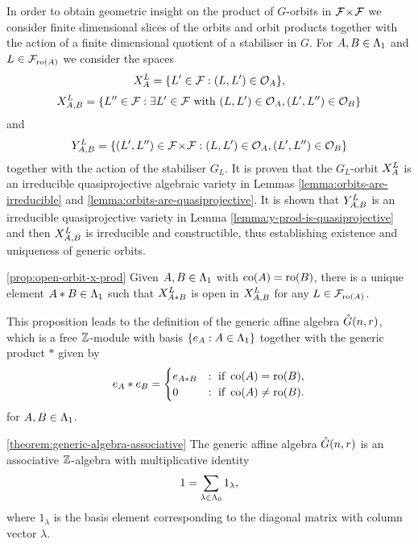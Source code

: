 \documentclass[a4paper, 11pt, twoside]{report}
\begin{document}
In order to obtain geometric insight on the product of $G$-orbits in $\dblflags$ we consider finite dimensional slices of the orbits and orbit products together with the action of a finite dimensional quotient of a stabiliser in $G$. For $A,B\in\matrices$ and $L\in\flags_{\ro{A}}$ we consider the spaces
\begin{equation*}
\xprod[L]{A} = \{L'\in\flags:(L,L')\in\orbit{A}\},
\end{equation*}
\begin{equation*}
\xprod[L]{A,B} = \{L''\in\flags:\exists L'\in\flags \text{ with } (L,L')\in\orbit{A}, (L',L'')\in\orbit{B}\}
\end{equation*}
and
\begin{equation*}
\yprod[L]{A,B} = \{(L',L'')\in\dblflags:(L,L')\in\orbit{A}, (L',L'')\in\orbit{B}\}
\end{equation*}
together with the action of the stabiliser $G_L$. It is proven that the $G_L$-orbit $\xprod[L]{A}$ is an irreducible quasiprojective algebraic variety in Lemmas \ref{lemma:orbits-are-irreducible} and \ref{lemma:orbits-are-quasiprojective}. It is shown that $\yprod[L]{A,B}$ is an irreducible quasiprojective variety in Lemma \ref{lemma:y-prod-is-quasiprojective} and then $\xprod[L]{A,B}$ is irreducible and constructible, thus establishing existence and uniqueness of generic orbits.

\begin{proposition*}\ref{prop:open-orbit-x-prod}
Given $A,B\in\matrices$ with $\co{A}=\ro{B}$, there is a unique element $A\ast B\in\matrices$ such that $\xprod[L]{A\ast B}$ is open in $\xprod[L]{A,B}$ for any $L\in\flags_{\ro{A}}$.
\end{proposition*}

This proposition leads to the definition of the generic affine algebra $\generic$, which is a free $\integers$-module with basis $\{e_A:A\in\matrices\}$ together with the generic product $\ast$ given by
\begin{equation*}
e_A\ast e_B = \begin{cases}
e_{A\ast B} &: \text{ if } \co{A}=\ro{B},\\
0 &: \text{ if } \co{A}\neq\ro{B}.
\end{cases}
\end{equation*}
for $A,B\in\matrices$.

\begin{theorem*}\ref{theorem:generic-algebra-associative}
The generic affine algebra $\generic$ is an associative $\integers$-algebra with multiplicative identity
\begin{equation*}
1=\sum_{\lambda\in\compositions} 1_\lambda,
\end{equation*}
where $1_\lambda$ is the basis element corresponding to the diagonal matrix with column vector $\lambda$.
\end{theorem*}
\end{document}

